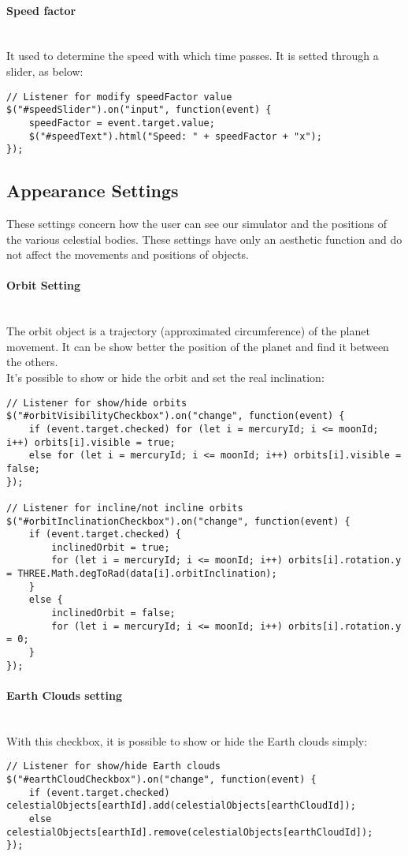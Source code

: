 \documentclass{article}
\begin{document}
\paragraph{Speed factor}\mbox{}\\
It used to determine the speed with which time passes. It is setted through a slider, as below:
\begin{lstlisting} 
// Listener for modify speedFactor value
$("#speedSlider").on("input", function(event) {
	speedFactor = event.target.value;
	$("#speedText").html("Speed: " + speedFactor + "x");
});
\end{lstlisting}

\subsection{Appearance Settings}
These settings concern how the user can see our simulator and the positions of the various celestial bodies. These settings have only an aesthetic function and do not affect the movements and positions of objects.
\paragraph{Orbit Setting}\mbox{}\\
The orbit object is a trajectory (approximated circumference) of the planet movement. It can be show better the position of the planet and find it between the others.\\
It's possible to show or hide the orbit and set the real inclination:
\begin{lstlisting}
// Listener for show/hide orbits
$("#orbitVisibilityCheckbox").on("change", function(event) {
	if (event.target.checked) for (let i = mercuryId; i <= moonId; i++) orbits[i].visible = true;
	else for (let i = mercuryId; i <= moonId; i++) orbits[i].visible = false;
});

// Listener for incline/not incline orbits
$("#orbitInclinationCheckbox").on("change", function(event) {
	if (event.target.checked) {
		inclinedOrbit = true;
		for (let i = mercuryId; i <= moonId; i++) orbits[i].rotation.y = THREE.Math.degToRad(data[i].orbitInclination);
	}
	else {
		inclinedOrbit = false;
		for (let i = mercuryId; i <= moonId; i++) orbits[i].rotation.y = 0;
	}
});
\end{lstlisting}
\paragraph{Earth Clouds setting}\mbox{}\\
With this checkbox, it is possible to show or hide the Earth clouds simply:
\begin{lstlisting}
// Listener for show/hide Earth clouds
$("#earthCloudCheckbox").on("change", function(event) {
	if (event.target.checked) celestialObjects[earthId].add(celestialObjects[earthCloudId]);
	else celestialObjects[earthId].remove(celestialObjects[earthCloudId]);
});
\end{lstlisting}
\end{document}

